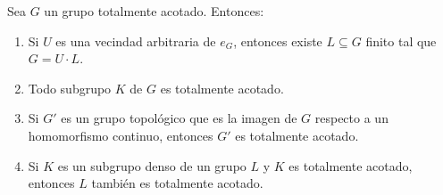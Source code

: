 \documentclass[12pt]{report}
\theoremstyle{largebreak}
\begin{document}
    \begin{propo}
        Sea $G$ un grupo totalmente acotado. Entonces:
        \begin{enumerate}
            \item Si $U$ es una vecindad arbitraria de $e_G$, entonces existe $L\subseteq G$ finito tal que $G=U\cdot L$.
            \item Todo subgrupo $K$ de $G$ es totalmente acotado.
            \item Si $G'$ es un grupo topológico que es la imagen de $G$ respecto a un homomorfismo continuo, entonces $G'$ es totalmente acotado.
            \item Si $K$ es un subgrupo denso de un grupo $L$ y $K$ es totalmente acotado, entonces $L$ también es totalmente acotado.
        \end{enumerate}
    \end{propo}
\end{document}

